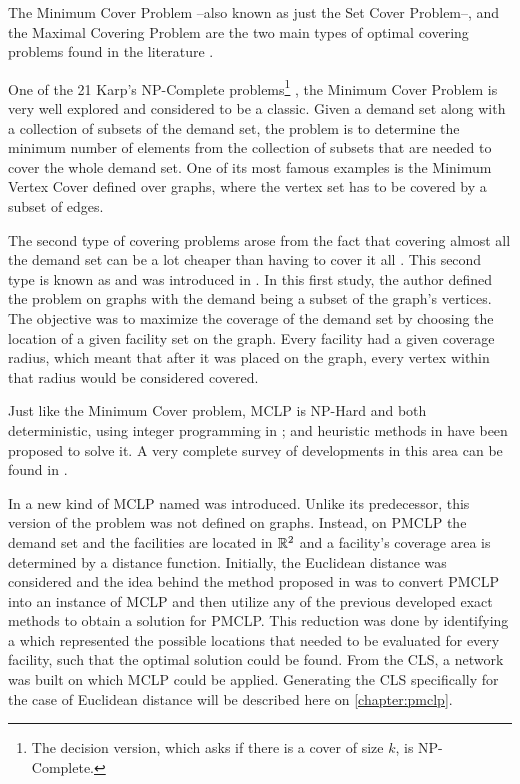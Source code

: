 The Minimum Cover Problem --also known as just the Set Cover Problem--, and the Maximal Covering Problem are the two main types of optimal covering problems found in the literature \cite{karatas}. 

One of the 21 Karp's NP-Complete problems\footnote{The decision version, which asks if there is a cover of size $k$, is NP-Complete.} \cite{karp}, the Minimum Cover Problem is very well explored and considered to be a classic. 
Given a demand set along with a collection of subsets of the demand set, the problem is to determine the minimum number of elements from the collection of subsets that are needed to cover the whole demand set. One of its most famous examples is the Minimum Vertex Cover defined over graphs, where the vertex set has to be covered by a subset of edges.

The second type of covering problems arose from the fact that covering almost all the demand set can be a lot cheaper than having to cover it all \cite{garcia}. This second type is known as  and was introduced in .
In this first study, the author defined the problem on graphs with the demand being a subset of the graph's vertices. The objective was to maximize the coverage of the demand set by choosing the location of a given facility set on the graph.
Every facility had a given coverage radius, which meant that after it was placed on the graph, every vertex within that radius would be considered covered.

Just like the Minimum Cover problem, MCLP is NP-Hard \cite{hatta:2013} and both deterministic, using integer programming in ; and heuristic methods in  have been proposed to solve it. A very complete survey of developments in this area can be found in .

In  a new kind of MCLP named  was introduced. Unlike its predecessor, this version of the problem was not defined on graphs. Instead, on PMCLP the demand set and the facilities are located in $\mathbb{R}^2$ and a facility's coverage area is determined by a distance function. 
Initially, the Euclidean distance was considered and the idea behind the method proposed in  was to convert PMCLP into an instance of MCLP and then utilize any of the previous developed exact methods to obtain a solution for PMCLP. This reduction was done by identifying a  which represented the possible locations that needed to be evaluated for every facility, such that the optimal solution could be found. From the CLS, a network was built on which MCLP could be applied. Generating the CLS specifically for the case of Euclidean distance will be described here on \autoref{chapter:pmclp}.

